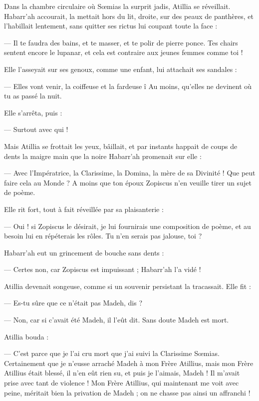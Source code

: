 \documentclass[a4paper, 11pt, oneside, polutonikogreek, french]{article}
\begin{document}
Dans la chambre circulaire où Sœmias la surprit jadis, Atillia se réveillait. Habarr'ah accourait, la mettait hors du lit, droite, sur des peaux de panthères, et l'habillait lentement, sans quitter ses rictus lui coupant toute la face :

--- Il te faudra des bains, et te masser, et te polir de pierre ponce. Tes chairs sentent encore le lupanar, et cela est contraire aux jeunes femmes comme toi !

Elle l'asseyait sur ses genoux, comme une enfant, lui attachait ses sandales :

--- Elles vont venir, la coiffeuse et la fardeuse î Au moins, qu'elles ne devinent où tu as passé la nuit.

Elle s'arrêta, puis :

--- Surtout avec qui !

Mais Atillia se frottait les yeux, bâillait, et par instants happait de coups de dents la maigre main que la noire Habarr'ah promenait sur elle :

--- Avec l'Impératrice, la Clarissime, la Domina, la mère de sa Divinité ! Que peut faire cela au Monde ? A moins que ton époux Zopiscus n'en veuille tirer un sujet de poème.

Elle rit fort, tout à fait réveillée par sa plaisanterie :

--- Oui ! si Zopiscus le désirait, je lui fournirais une composition de poème, et au besoin lui en répéterais les rôles. Tu n'en serais pas jalouse, toi ?

Habarr'ah eut un grincement de bouche sans dents :

--- Certes non, car Zopiscus est impuissant ; Habarr'ah l'a vidé !

Atillia devenait songeuse, comme si un souvenir persistant la tracassait. Elle fit :

--- Es-tu sûre que ce n'était pas Madeh, dis ?

--- Non, car si c'avait été Madeh, il l'eût dit. Sans doute Madeh est mort.

Atillia bouda :

--- C'est parce que je l'ai cru mort que j'ai suivi la Clarissime Sœmias. Certainement que je n'eusse arraché Madeh à mon Frère Atillius, mais mon Frère Atillius était blessé, il n'en eût rien su, et puis je l'aimais, Madeh ! Il m'avait prise avec tant de violence ! Mon Frère Atillius, qui maintenant me voit avec peine, méritait bien la privation de Madeh ; on ne chasse pas ainsi un affranchi !
\end{document}
